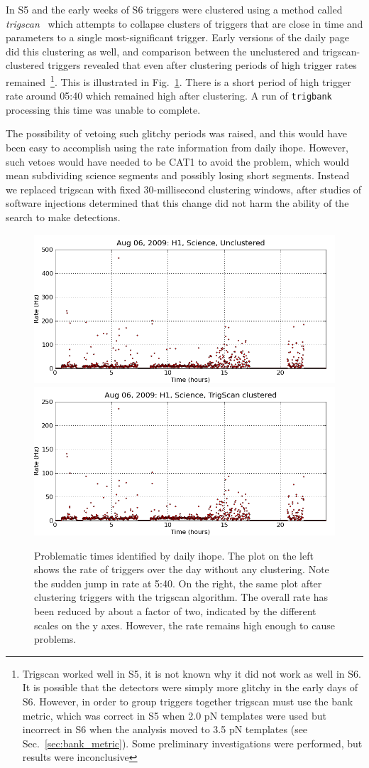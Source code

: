 In S5 and the early weeks of S6 triggers were clustered using a method
called \emph{trigscan}~\cite{SenguptaTrigScan:2008} which attempts to
collapse clusters of triggers that are close in time and parameters to
a single most-significant trigger.  Early versions of the daily page
did this clustering as well, and comparison between the unclustered
and trigscan-clustered triggers revealed that even after clustering
periods of high trigger rates remained~\footnote{Trigscan worked well
in S5, it is not known why it did not work as well in S6.  It is
possible that the detectors were simply more glitchy in the early
days of S6.  However, in order to group triggers together trigscan
must use the bank metric, which was correct in S5 when 2.0 pN
templates were used but incorrect in S6 when the analysis moved to 3.5
pN templates (see Sec.~\ref{sec:bank_metric}).  Some preliminary
investigations were performed, but results were inconclusive}.  This
is illustrated in Fig.~\ref{f:daily_ihope_high_rates}.  There is a
short period of high trigger rate around 05:40 which remained high
after clustering.  A run of \texttt{trigbank} processing this time was
unable to complete.

The possibility of vetoing such glitchy periods was raised, and this
would have been easy to accomplish using the rate information from
daily ihope.  However, such vetoes would have needed to be CAT1 to
avoid the problem, which would mean subdividing science segments and
possibly losing short segments.  Instead we replaced trigscan with
fixed 30-millisecond clustering windows, after studies of software
injections determined that this change did not harm the ability of the
search to make detections.

\begin{figure}
  \includegraphics[width=0.5\linewidth]{figures/detchar/20090806_H1_0_UNCLUSTERED_rate_vs_time}
  \includegraphics[width=0.5\linewidth]{figures/detchar/20090806_H1_0_TS_CLUSTERED_rate_vs_time}
  \caption[Problematic times identified by daily ihope]{
  \label{f:daily_ihope_high_rates}
Problematic times identified by daily ihope.  The plot on the left
shows the rate of triggers over the day without any clustering.  Note
the sudden jump in rate at 5:40.  On the right, the same plot after
clustering triggers with the trigscan algorithm.  The overall rate has
been reduced by about a factor of two, indicated by the different
scales on the y axes.  However, the rate remains high enough to cause
problems.
}
\end{figure}%

